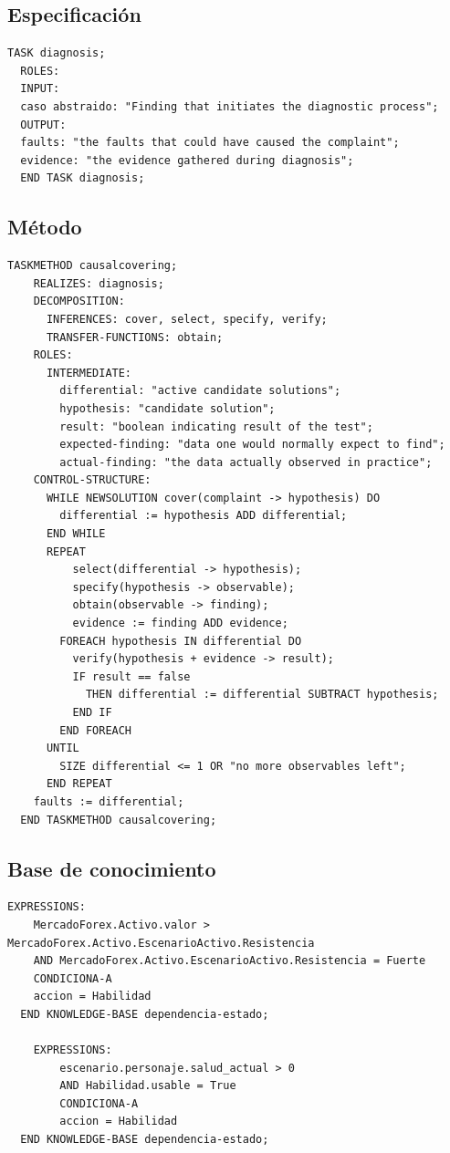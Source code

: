 \subsection{Especificación}

\begin{lstlisting}[style=Python-color, caption={Pseudocódigo de la especificación}]
  TASK diagnosis;
  ROLES:
  INPUT:
  caso abstraido: "Finding that initiates the diagnostic process";
  OUTPUT:
  faults: "the faults that could have caused the complaint";
  evidence: "the evidence gathered during diagnosis";
  END TASK diagnosis;
\end{lstlisting}

\subsection{Método}

\begin{lstlisting}[style=Python-color, caption={Pseudocódigo de Completo}]  
  TASKMETHOD causalcovering;
    REALIZES: diagnosis;
    DECOMPOSITION:
      INFERENCES: cover, select, specify, verify;
      TRANSFER-FUNCTIONS: obtain;
    ROLES:
      INTERMEDIATE:
        differential: "active candidate solutions";
        hypothesis: "candidate solution";
        result: "boolean indicating result of the test";
        expected-finding: "data one would normally expect to find";
        actual-finding: "the data actually observed in practice";
    CONTROL-STRUCTURE:
      WHILE NEWSOLUTION cover(complaint -> hypothesis) DO
        differential := hypothesis ADD differential;
      END WHILE
      REPEAT
          select(differential -> hypothesis);
          specify(hypothesis -> observable);
          obtain(observable -> finding);
          evidence := finding ADD evidence;
        FOREACH hypothesis IN differential DO
          verify(hypothesis + evidence -> result);
          IF result == false
            THEN differential := differential SUBTRACT hypothesis;
          END IF
        END FOREACH
      UNTIL
        SIZE differential <= 1 OR "no more observables left";
      END REPEAT
    faults := differential;
  END TASKMETHOD causalcovering;
\end{lstlisting}


\subsection{Base de conocimiento}
\begin{lstlisting}[style=Python-color, caption={regla-abstraccion}]
  EXPRESSIONS:
    MercadoForex.Activo.valor > MercadoForex.Activo.EscenarioActivo.Resistencia
    AND MercadoForex.Activo.EscenarioActivo.Resistencia = Fuerte
    CONDICIONA-A
    accion = Habilidad
  END KNOWLEDGE-BASE dependencia-estado;

    EXPRESSIONS:
        escenario.personaje.salud_actual > 0
        AND Habilidad.usable = True
        CONDICIONA-A
        accion = Habilidad
  END KNOWLEDGE-BASE dependencia-estado;
\end{lstlisting}

